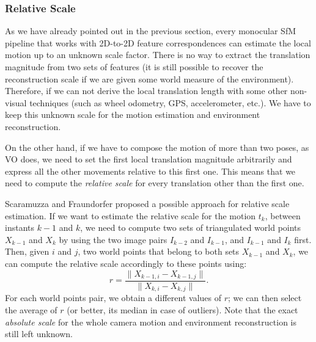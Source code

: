 \subsubsection{Relative Scale}
As we have already pointed out in the previous section, every monocular SfM 
pipeline that works with 2D-to-2D feature correspondences can estimate the 
local motion up to an unknown scale factor. There is no way to extract 
the translation magnitude from two sets of features (it is still possible 
to recover the reconstruction scale if we are given some world measure of the
environment).
Therefore, if we can not derive the local translation length with some other
non-visual techniques (such as wheel odometry, GPS, accelerometer, etc.).
We have to keep this unknown scale for the motion estimation and 
environment reconstruction.

On the other hand, if we have to compose the motion of more than two poses, 
as VO does, we need to set the first local translation magnitude 
arbitrarily and express all the other movements relative to this first one.
This means that we need to compute the \textit{relative scale}
for every translation other than the first one.

Scaramuzza and Fraundorfer\cite{scaramuzzaVisualOdometryI} proposed a possible approach for relative scale estimation. If we want to estimate the relative scale for 
the motion $t_k$, between instants $k-1$ and $k$, we need to compute 
two sets of triangulated world points $X_{k-1}$ and $X_{k}$ by using 
the two image pairs $I_{k-2}$ and $I_{k-1}$, and $I_{k-1}$ and $I_{k}$ first. 
Then, given $i$ and $j$, two world points that belong to both sets $X_{k-1}$ and 
$X_{k}$, we can compute the relative scale accordingly to these points using:
%
\begin{equation}
	\label{eq:relative_scale}
	r = \frac{\| X_{k-1, i} - X_{k - 1, j} \|}{\| X_{k, i} - X_{k, j} \|}
	\text{.}
\end{equation}
%
\noindent For each world points pair, we obtain a different values of $r$;
we can then select the average of $r$ (or better, its median in case of 
outliers).
%
Note that the exact \textit{absolute scale} for the whole 
camera motion and environment reconstruction is still left unknown.

